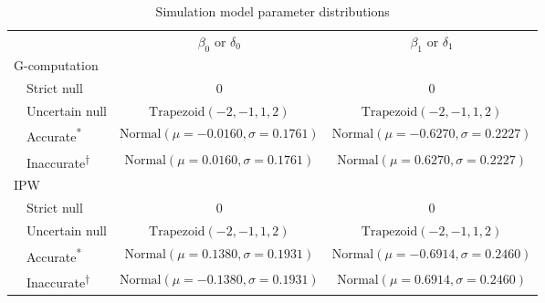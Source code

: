 \documentclass[]{article}
\begin{document}
\begin{table}[]
	\caption{Simulation model parameter distributions}
	\begin{tabular}{llcc}
		\hline
		&                        & $\beta_0$ or $\delta_0$                     & $\beta_1$ or $\delta_1$                     \\ \cline{3-4} 
		\multicolumn{2}{l}{G-computation} &                                             &                                             \\
		& Strict null            & 0                                           & 0                                           \\
		& Uncertain null         & $\text{Trapezoid}(-2,-1,1,2)$               & $\text{Trapezoid}(-2,-1,1,2)$               \\
		& Accurate\textsuperscript{*}              & $\text{Normal}(\mu=-0.0160, \sigma=0.1761)$ & $\text{Normal}(\mu=-0.6270, \sigma=0.2227)$ \\
		& Inaccurate\textsuperscript{†}             & $\text{Normal}(\mu=0.0160, \sigma=0.1761)$  & $\text{Normal}(\mu=0.6270, \sigma=0.2227)$  \\
		\multicolumn{2}{l}{IPW}           &                                             &                                             \\
		& Strict null            & 0                                           & 0                                           \\
		& Uncertain null         & $\text{Trapezoid}(-2,-1,1,2)$               & $\text{Trapezoid}(-2,-1,1,2)$               \\
		& Accurate\textsuperscript{*}              & $\text{Normal}(\mu=0.1380, \sigma=0.1931)$  & $\text{Normal}(\mu=-0.6914, \sigma=0.2460)$ \\
		& Inaccurate\textsuperscript{†}             & $\text{Normal}(\mu=-0.1380, \sigma=0.1931)$ & $\text{Normal}(\mu=0.6914, \sigma=0.2460)$  \\ \hline
	\end{tabular}
	\label{tab2}
\end{table}
\end{document}
